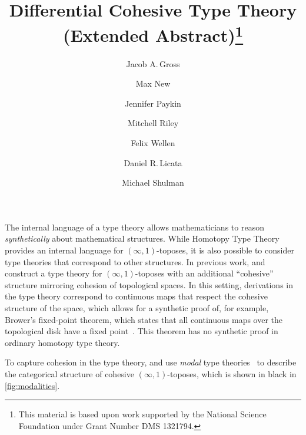 \documentclass{article}
\title{Differential Cohesive Type Theory (Extended Abstract)\thanks{This
    material is based upon work supported by the National Science Foundation
    under Grant Number DMS 1321794.}}
\author{Jacob A.\,Gross}
\affil[1]{University of Pittsburgh}
\author[2]{Max New}
\affil[2]{Northeastern University}
\author[3]{Jennifer Paykin}
\affil[3]{University of Pennsylvania}
\author[4]{Mitchell Riley}
\affil[4]{Wesleyan University}
\author[5]{Felix Wellen}
\affil[5]{Karlsruhe Institute of Technology}
\author[4]{Daniel R.\,Licata}
\author[6]{Michael Shulman}
\affil[6]{University of San Diego}
\date{}
\begin{document}
\maketitle


The internal language of a type theory allows mathematicians to reason
\emph{synthetically} about mathematical structures. While Homotopy Type Theory
provides an internal language for $(∞,1)$-toposes, it is also possible to
consider type theories that correspond to other structures. In previous work,
\citet{Shulman2015} and \citet{Licata2016} construct a type theory for
$(∞,1)$-toposes with an additional ``cohesive'' structure mirroring cohesion of
topological spaces. In this setting, derivations in the type theory correspond
to continuous maps that respect the cohesive structure of the space, which
allows for a synthetic proof of, for example, Brower's fixed-point theorem,
which states that all continuous maps over the topological disk have a fixed
point~\citep{Shulman2015}. This theorem has no synthetic proof in ordinary
homotopy type theory.

To capture cohesion in the type theory, \citep{Shulman2015} and
\citep{Licata2016} use \emph{modal} type theories~
to describe the categorical structure of cohesive $(∞,1)$-toposes, which is
shown in black in \cref{fig:modalities}. 
\end{document}
